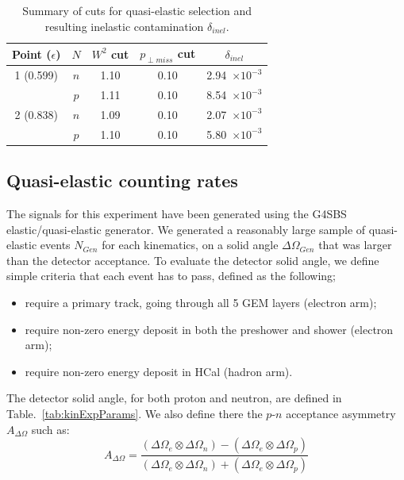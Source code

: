 \begin{table}[h]
\centering
\begin{tabular}{|c|c|c|c|c|}
\hline
Point ($\epsilon$) & $N$ & $W^2$ cut & $p_{\perp miss}$ cut & $\delta_{inel}$ \\
\hline
1 (0.599) & $n$ & 1.10 & 0.10 & 2.94~$\times 10^{-3}$ \\
 & $p$ & 1.11 & 0.10 & 8.54~$\times 10^{-3}$ \\
\hline
2 (0.838) & $n$ & 1.09 & 0.10 & 2.07~$\times 10^{-3}$ \\
 & $p$ & 1.10 & 0.10 & 5.80~$\times 10^{-3}$ \\
\hline
\end{tabular} 
\caption{Summary of cuts for quasi-elastic selection and resulting inelastic contamination $\delta_{inel}$.}
\label{tab:contam}
\end{table}

\subsection{Quasi-elastic counting rates}

The signals for this experiment have been generated using the G4SBS elastic/quasi-elastic generator. 
We generated a reasonably large sample of quasi-elastic events $N_{Gen}$ for each kinematics, on a solid angle $\Delta\Omega_{Gen}$ that was larger than the detector acceptance.
To evaluate the detector solid angle, we define simple criteria that each event has to pass, defined as the following;
%
\begin{itemize}
\item{require a primary track, going through all 5 GEM layers (electron arm);}
\item{require non-zero energy deposit in both the preshower and shower (electron arm);}
\item{require non-zero energy deposit in HCal (hadron arm).}
\end{itemize}
%
The detector solid angle, for both proton and neutron, are defined in Table.~\ref{tab:kinExpParams}.
We also define there the $p$-$n$ acceptance asymmetry $A_{\Delta\Omega}$ such as:
\begin{equation}
  A_{\Delta\Omega} = \frac{(\Delta\Omega_e \otimes \Delta\Omega_n)-(\Delta\Omega_e \otimes \Delta\Omega_p)}{(\Delta\Omega_e \otimes \Delta\Omega_n)+(\Delta\Omega_e \otimes \Delta\Omega_p)}
\end{equation}

